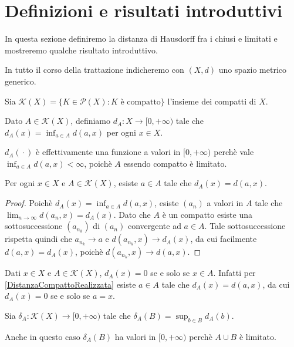 \section{Definizioni e risultati introduttivi}
In questa sezione definiremo la distanza di Hausdorff fra i chiusi e limitati e mostreremo qualche risultato introduttivo.

In tutto il corso della trattazione indicheremo con $(X,d)$ uno spazio metrico generico.

\begin{definition}
	Sia $\mathcal{K}(X)=\{K\in \mathcal{P}(X) : K \text{ è compatto}\}$ l'insieme dei compatti di $X$.
\end{definition}

\begin{definition}
	Dato $A\in \mathcal{K}(X)$, definiamo $d_A: X\to [0,+\infty)$ tale che $d_A(x)=\inf_{a\in A}d(a,x)$ per ogni $x\in X$.
\end{definition}

\begin{remark}
	$d_A({}\cdot{})$ è effettivamente una funzione a valori in $[0,+\infty)$ perchè vale $\inf_{a\in A}d(a,x)<\infty$, poichè $A$ essendo compatto è limitato.
\end{remark}

\begin{lemma}\label{DistanzaCompattoRealizzata}
	Per ogni $x\in X$ e $A \in \mathcal{K}(X)$, esiste $a\in A$ tale che $d_A(x)=d(a,x)$.
\end{lemma}
\begin{proof}
	Poichè $d_A(x)=\inf_{a\in A} d(a,x)$, esiste $(a_n)$ a valori in $A$ tale che $\lim_{n\to\infty}d(a_n,x)=d_A(x)$. Dato che $A$ è un compatto esiste una sottosuccessione $(a_{n_k})$ di $(a_n)$ convergente ad $a\in A$. Tale sottosuccessione rispetta quindi che $a_{n_k}\to a$ e $d(a_{n_k},x)\to d_A(x)$, da cui facilmente $d(a,x)=d_A(x)$, poichè $d(a_{n_k},x)\to d(a,x)$.
\end{proof}
\begin{remark}\label{DistanzaCompattoAppartenenza}
	Dati $x\in X$ e $A \in \mathcal{K}(X)$, $d_A(x)=0$ se e solo se $x\in A$. Infatti per \cref{DistanzaCompattoRealizzata} esiste $a\in A$ tale che $d_A(x)=d(a,x)$, da cui $d_A(x)=0$ se e solo se $a=x$.
\end{remark}

\begin{definition}\label{DistanzaFraCompatti}
	Sia $\delta_A:\mathcal{K}(X)\to [0,+\infty)$ tale che $\delta_A(B)=\sup_{b\in B} d_A(b)$.
\end{definition}
\begin{remark}
	Anche in questo caso $\delta_A(B)$ ha valori in $[0,+\infty)$ perchè $A\cup B$ è limitato.
\end{remark}

